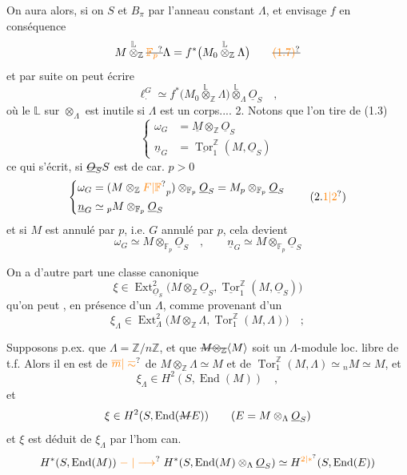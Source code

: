 On aura alors, si on  $S$ et $B_{\pi}$ par l'anneau constant $\Lambda$, et envisage $f$ en conséquence
\[
M\overset{\mathbb L}{\otimes}_{\mathbb Z}\deleted{\unsure{\mathbb F_p}}\Lambda
=f^*\bigl(M_0\overset{\mathbb L}{\otimes}_{\mathbb Z}\Lambda\bigr)\tag*{\deleted{\unsure{(1.7)}}}
\]
et par suite on peut écrire
\[
\ell_{\cdot}^{G}\simeq f^*\bigl(M_0\overset{\mathbb L}{\otimes}_{\mathbb Z}\Lambda\bigr)\overset{\mathbb L}{\otimes}_{\Lambda}\underline{O}_S
\quad ,\tag*{(1.8)}
\]
où le $\mathbb L$ sur $\otimes_{\Lambda}$ est inutile si $\Lambda$ est un corps....
2. Notons que  l'on tire de (1.3)
\[
\left\{\begin{aligned}
\omega_{G}&=\underline{M}\otimes_{\mathbb Z}\underline{O}_S\\
\underline{n}_G&=\underline{\operatorname{Tor}}^{\mathbb Z}_1(M,\underline{O}_S)
\end{aligned}\right.\tag*{(2.1)}
\]
ce qui s'écrit, si $\deleted{\underline{O}_S}S$ est de car. $p>0$
\[
\left\{\begin{aligned}
\omega_G&=(M\otimes_{\mathbb Z}\unsure{F|\mathbb F}_p)\otimes_{\mathbb F_p}\underline{O}_S=M_p\otimes_{\mathbb F_p}\underline{O}_S\\
\underline{n}_G&\simeq {}_pM\otimes_{\mathbb F_p}\underline{O}_S
\end{aligned}\right.\tag*{(2.\unsure{1|2})}
\]
et si $M$ est annulé par $p$, i.e. $G$ annulé par $p$, cela devient
\[
\omega_G\simeq M\otimes_{\mathbb F_p}\underline{O}_S
\quad ,\qquad \underline{n}_G\simeq M\otimes_{\mathbb F_p}\underline{O}_S
\tag*{$(2.2')$}
\]

On a d'autre part une classe canonique
\[
\xi\in\operatorname{Ext}_{\underline{O}_S}^{2}\bigl(M\otimes_{\mathbb Z}\underline{O}_S,\underline{\operatorname{Tor}}^{\mathbb Z}_1(M,\underline{O}_S)\bigr)
\]
qu'on peut , en présence d'un $\Lambda$, comme provenant d'un
\[
\xi_{\Lambda}\in\operatorname{Ext}_{\Lambda}^{2}\bigl(M\otimes_{\mathbb Z}\Lambda,\operatorname{Tor}^{\mathbb Z}_1(M,\Lambda)\bigr)\quad ;
\]

Supposons p.ex. que $\Lambda=\mathbb Z/n\mathbb Z$, et que $\deleted{M\otimes_{\mathbb Z}}\inserted{M}$ soit un $\Lambda$-module loc. libre de t.f. Alors il en est de $\unsure{\overline{m}|\eqsim}$ de $M\otimes_{\mathbb Z}\Lambda\simeq M$ et de $\operatorname{Tor}^{\mathbb Z}_1(M,\Lambda)\simeq {}_nM\simeq M$, et
\[
\xi_{\Lambda}\in H^2(S,\operatorname{End}(M))\quad ,
\]
et 
\[
\xi\in H^2(S,\operatorname{End}(\deleted{M}E))\qquad (E=M\otimes_{\Lambda}\underline{O}_S)
\]
et $\xi$ est déduit de $\xi_{\Lambda}$ par l'hom can.
\[
H^*(S,\operatorname{End}(M))\mathrel{\unsure{\relbar|\longrightarrow}}
H^*(S,\operatorname{End}(M)\otimes_{\Lambda}\underline{O}_S)\simeq H^{\unsure{2|*}}(S,\operatorname{End}(E))
\]

